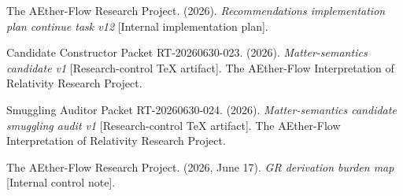 \documentclass[11pt]{article}
\begin{document}
The AEther-Flow Research Project. (2026). \emph{Recommendations
implementation plan continue task v12} [Internal implementation plan].

Candidate Constructor Packet RT-20260630-023. (2026). \emph{Matter-semantics
candidate v1} [Research-control TeX artifact]. The AEther-Flow Interpretation
of Relativity Research Project.

Smuggling Auditor Packet RT-20260630-024. (2026). \emph{Matter-semantics
candidate smuggling audit v1} [Research-control TeX artifact]. The
AEther-Flow Interpretation of Relativity Research Project.

The AEther-Flow Research Project. (2026, June 17). \emph{GR derivation burden
map} [Internal control note].
\end{document}
